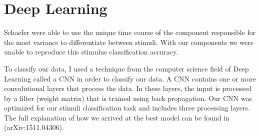 \chapter{Deep Learning}
Schaefer \etal \citeyear{schaefer_name_2011} were able to use the unique time course of the component responsible for the most variance to differentiate between stimuli.
With our components we were unable to reproduce this stimulus classification accuracy. 
 
To classify our data, I used a technique from the computer science field of Deep Learning called a \ac{CNN} in order to classify our data.
A \ac{CNN} contains one or more convolutional layers that process the data.
In these layers, the input is processed by a filter (weight matrix) that is trained using back propagation. 
Our \ac{CNN} was optimized for our stimuli classification task and includes three processing layers.
The full explanation of how we arrived at the best model can be found in \cite{stober_ICLR2016} (arXiv:1511.04306).

